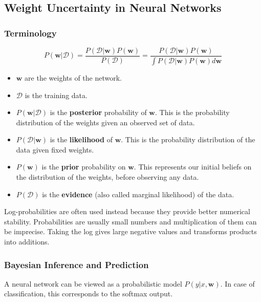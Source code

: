 \subsection{Weight Uncertainty in Neural Networks}
\subsubsection{Terminology}

\begin{equation}
    P(\mathbf{w}|\mathcal{D}) = \frac{P(\mathcal{D}|\mathbf{w})P(\mathbf{w})}{P(\mathcal{D})} = \frac{P(\mathcal{D}|\mathbf{w})P(\mathbf{w})}{\int P(\mathcal{D}|\mathbf{w})P(\mathbf{w}) d\mathbf{w}}
\end{equation}

\begin{itemize}
    \item $\mathbf{w}$ are the weights of the network.
 \item $\mathcal{D}$ is the training data.
\item $P(\mathbf{w}|\mathcal{D})$ is the \textbf{posterior} probability of $\mathbf{w}$. This is the probability distribution of the weights given an observed set of data.
\item $P(\mathcal{D}|\mathbf{w})$ is the \textbf{likelihood} of $\mathbf{w}$. This is the probability distribution of the data given fixed weights.
\item $P(\mathbf{w})$ is the \textbf{prior} probability on $\mathbf{w}$. This represents our initial beliefs on the distribution of the weights, before observing any data.
\item $P(\mathcal{D})$ is the \textbf{evidence} (also called marginal likelihood) of the data.
\end{itemize}


Log-probabilities are often used instead because they provide better numerical stability. Probabilities are usually small numbers and multiplication of them can be imprecise. Taking the log gives large negative values and transforms products into additions.


\subsubsection{Bayesian Inference and Prediction}

A neural network can be viewed as a probabilistic model $P(y|x, \mathbf{w})$. In case of classification, this corresponds to the softmax output.

